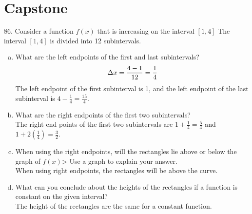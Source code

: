 \documentclass[11pt]{article}
\newcommand*{\set}{\setcounter{equation}{0}}
\begin{document}
\section{Capstone}
86. Consider a function $f(x)$ that is increasing on the interval $[1, 4]$
The interval $[1, 4]$ is divided into 12 subintervals.\\
\begin{enumerate}[(a)]
    \item What are the left endpoints of the first and last
    subintervals?
        \begin{align}
            \set
            \Delta x=\frac{4-1}{12}=\frac{1}{4}
        \end{align}
        \indent The left endpoint of the first subinterval is 1, and the left endpoint of the last subinterval is $4-\frac{1}{4}=\frac{15}{4}$.

    \item What are the right endpoints of the first two subintervals?\\
        \indent The right end points of the first two subintervals are $1+\frac{1}{4}=\frac{5}{4}$ and $1+2\left(\frac{1}{4}\right)=\frac{3}{2}$.
    \item When using the right endpoints, will the rectangles lie above or below the graph of $f(x)$> Use a graph to explain your answer.\\
        \indent When using right endpoints, the rectangles will be above the curve.
    \item What can you conclude about the heights of the rectangles if a function is constant on the given interval?\\
        \indent The height of the rectangles are the same for a constant function.
\end{enumerate}
\end{document}
